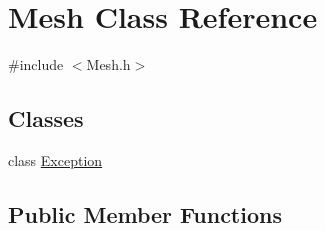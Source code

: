 \hypertarget{class_mesh}{
\section{Mesh Class Reference}
\label{class_mesh}
}


{\ttfamily \#include $<$Mesh.h$>$}

\subsection*{Classes}
\begin{DoxyCompactItemize}
\item 
class \hyperlink{class_mesh_1_1_exception}{Exception}
\end{DoxyCompactItemize}
\subsection*{Public Member Functions}
